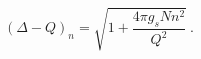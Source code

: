 \begin{equation}
 (\Delta -Q)_n = \sqrt{1+ \frac{4 \pi g_s N n^2}{Q^2}} ~.
\label{anomalous}
\end{equation}


